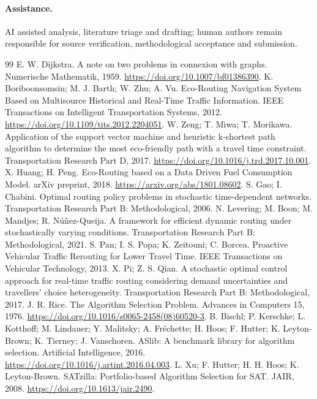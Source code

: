 \documentclass[10pt,a4paper]{article}
\begin{document}
\paragraph{Assistance.} AI assisted analysis, literature triage and drafting; human authors remain responsible for source verification, methodological acceptance and submission.

\begin{thebibliography}{99}
\small\setlength{\itemsep}{2pt}\setlength{\parskip}{0pt}
 E. W. Dijkstra. A note on two problems in connexion with graphs. Numerische Mathematik, 1959. \url{https://doi.org/10.1007/bf01386390}.
 K. Boriboonsomsin; M. J. Barth; W. Zhu; A. Vu. Eco-Routing Navigation System Based on Multisource Historical and Real-Time Traffic Information. IEEE Transactions on Intelligent Transportation Systems, 2012. \url{https://doi.org/10.1109/tits.2012.2204051}.
 W. Zeng; T. Miwa; T. Morikawa. Application of the support vector machine and heuristic k-shortest path algorithm to determine the most eco-friendly path with a travel time constraint. Transportation Research Part D, 2017. \url{https://doi.org/10.1016/j.trd.2017.10.001}.
 X. Huang; H. Peng. Eco-Routing based on a Data Driven Fuel Consumption Model. arXiv preprint, 2018. \url{https://arxiv.org/abs/1801.08602}.
 S. Gao; I. Chabini. Optimal routing policy problems in stochastic time-dependent networks. Transportation Research Part B: Methodological, 2006.
 N. Levering; M. Boon; M. Mandjes; R. N\'u\~nez-Queija. A framework for efficient dynamic routing under stochastically varying conditions. Transportation Research Part B: Methodological, 2021.
 S. Pan; I. S. Popa; K. Zeitouni; C. Borcea. Proactive Vehicular Traffic Rerouting for Lower Travel Time. IEEE Transactions on Vehicular Technology, 2013.
 X. Pi; Z. S. Qian. A stochastic optimal control approach for real-time traffic routing considering demand uncertainties and travellers' choice heterogeneity. Transportation Research Part B: Methodological, 2017.
 J. R. Rice. The Algorithm Selection Problem. Advances in Computers 15, 1976. \url{https://doi.org/10.1016/s0065-2458(08)60520-3}.
 B. Bischl; P. Kerschke; L. Kotthoff; M. Lindauer; Y. Malitsky; A. Fr\'echette; H. Hoos; F. Hutter; K. Leyton-Brown; K. Tierney; J. Vanschoren. ASlib: A benchmark library for algorithm selection. Artificial Intelligence, 2016. \url{https://doi.org/10.1016/j.artint.2016.04.003}.
 L. Xu; F. Hutter; H. H. Hoos; K. Leyton-Brown. SATzilla: Portfolio-based Algorithm Selection for SAT. JAIR, 2008. \url{https://doi.org/10.1613/jair.2490}.

\end{thebibliography}
\end{document}
